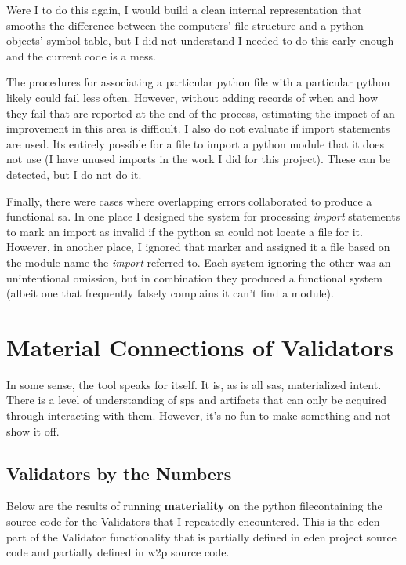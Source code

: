 \documentclass[a4paper,man,natbib,floatsintext]{apa6}
\begin{document}
  Were I to do this again, I would build a clean internal representation that smooths the difference between the computers' file structure and a python objects' symbol table, but I did not understand I needed to do this early enough and the current code is a mess. 

  The procedures for associating a particular \Gls{python} file with a particular \Gls{python} likely could fail less often. However, without adding records of when and how they fail that are reported at the end of the process, estimating the impact of an improvement in this area is difficult. I also do not evaluate if import statements are used. Its entirely possible for a file to import a \Gls{python} module that it does not use (I have unused imports in the work I did for this project). These can be detected, but I do not do it.

  Finally, there were cases where overlapping errors collaborated to produce a functional \gls{sa}. In one place I designed the system for processing \textit{import} statements to mark an import as invalid if the \Gls{python} \gls{sa} could not locate a file for it. However, in another place, I ignored that marker and assigned it a file based on the module name the \textit{import} referred to. Each system ignoring the other was an unintentional omission, but in combination they produced a functional system (albeit one that frequently falsely complains it can't find a module).

  \section{Material Connections of Validators}
  In some sense, the tool speaks for itself. It is, as is all \glspl{sa}, materialized intent. There is a level of understanding of \glspl{sp} and artifacts that can only be acquired through interacting with them. However, it's no fun to make something and not show it off.

  \subsection{Validators by the Numbers}
  Below are the results of running \textbf{materiality} on the \Gls{python} file\footnotemark containing the source code for the Validators that I repeatedly encountered. This is the \acrshort{eden} part of the Validator functionality that is partially defined in \acrshort{eden} project source code and partially defined in \gls{w2p} source code.
\end{document}
